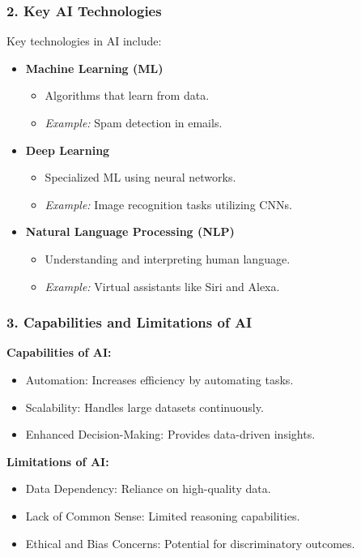 \documentclass{beamer}
\begin{document}
\begin{frame}[fragile]
    \frametitle{2. Key AI Technologies}
    Key technologies in AI include:
    \begin{itemize}
        \item \textbf{Machine Learning (ML)}
        \begin{itemize}
            \item Algorithms that learn from data.
            \item \textit{Example:} Spam detection in emails.
        \end{itemize}
        
        \item \textbf{Deep Learning}
        \begin{itemize}
            \item Specialized ML using neural networks.
            \item \textit{Example:} Image recognition tasks utilizing CNNs.
        \end{itemize}
        
        \item \textbf{Natural Language Processing (NLP)}
        \begin{itemize}
            \item Understanding and interpreting human language.
            \item \textit{Example:} Virtual assistants like Siri and Alexa.
        \end{itemize}
    \end{itemize}
\end{frame}

\begin{frame}[fragile]
    \frametitle{3. Capabilities and Limitations of AI}
    \textbf{Capabilities of AI:}
    \begin{itemize}
        \item Automation: Increases efficiency by automating tasks.
        \item Scalability: Handles large datasets continuously.
        \item Enhanced Decision-Making: Provides data-driven insights.
    \end{itemize}

    \textbf{Limitations of AI:}
    \begin{itemize}
        \item Data Dependency: Reliance on high-quality data.
        \item Lack of Common Sense: Limited reasoning capabilities.
        \item Ethical and Bias Concerns: Potential for discriminatory outcomes.
    \end{itemize}
\end{frame}
\end{document}
